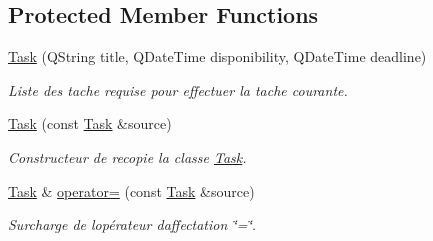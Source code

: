 \subsection*{Protected Member Functions}
\begin{DoxyCompactItemize}
\item 
\hyperlink{class_task_ae40633696ddb87d37de1f0015b840c34}{Task} (Q\+String title, Q\+Date\+Time disponibility, Q\+Date\+Time deadline)
\begin{DoxyCompactList}\small\item\em Liste des tache requise pour effectuer la tache courante. \end{DoxyCompactList}\item 
\hyperlink{class_task_a4413ddd0e29a4588808ee1f8f3367b5c}{Task} (const \hyperlink{class_task}{Task} \&source)
\begin{DoxyCompactList}\small\item\em Constructeur de recopie la classe \hyperlink{class_task}{Task}. \end{DoxyCompactList}\item 
\hyperlink{class_task}{Task} \& \hyperlink{class_task_a5ffb0ba25d5fccd6cafea4153df1bee3}{operator=} (const \hyperlink{class_task}{Task} \&source)
\begin{DoxyCompactList}\small\item\em Surcharge de l\textquotesingle{}opérateur d\textquotesingle{}affectation \char`\"{}=\char`\"{}. \end{DoxyCompactList}\end{DoxyCompactItemize}
